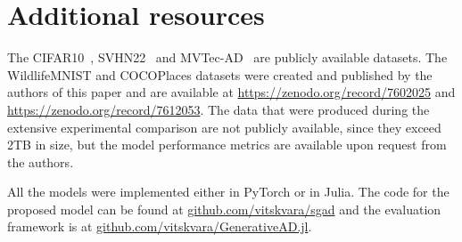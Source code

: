 \chapter{Additional resources} \label{sec:appendix_links}

The CIFAR10~\cite{krizhevsky2009learning}, SVHN22~\cite{netzer2011reading} and MVTec-AD~\cite{bergmann2019mvtec} are publicly available datasets. The WildlifeMNIST and COCOPlaces datasets were created and published by the authors of this paper and are available at \url{https://zenodo.org/record/7602025} and \url{https://zenodo.org/record/7612053}. The data that were produced during the extensive experimental comparison are not publicly available, since they exceed 2TB in size, but the model performance metrics are available upon request from the authors.


All the models were implemented either in PyTorch or in Julia. The code for the proposed model can be found at \url{github.com/vitskvara/sgad} and the evaluation framework is at \url{github.com/vitskvara/GenerativeAD.jl}. 

